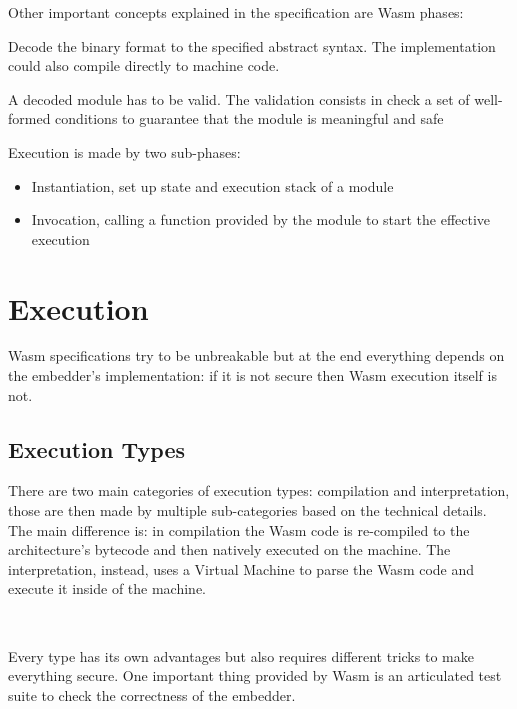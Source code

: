 Other important concepts explained in the specification are Wasm phases:

\begin{description}[font=$\bullet$ \scshape\bfseries]
  \item[Decoding]
        Decode the binary format to the specified abstract syntax. The implementation could also compile directly to machine code.
  \item[Validation]
        A decoded module has to be valid. The validation consists in check a set of well-formed conditions to guarantee that the module is meaningful and safe ~\cite{wasm-polkadot-wiki}
  \item[Execution]
        Execution is made by two sub-phases:
        \begin{itemize}
          \item Instantiation, set up state and execution stack of a module
          \item Invocation, calling a function provided by the module to start the effective execution
        \end{itemize}
\end{description}

\section{Execution}

Wasm specifications try to be unbreakable but at the end everything depends on the embedder's implementation: if it is not secure then Wasm execution itself is not.

\subsection{Execution Types}

There are two main categories of execution types: compilation and interpretation, those are then made by multiple sub-categories based on the technical details. The main difference is: in compilation the Wasm code is re-compiled to the architecture's bytecode and then natively executed on the machine. The interpretation, instead, uses a Virtual Machine to parse the Wasm code and execute it inside of the machine.

\

Every type has its own advantages but also requires different tricks to make everything secure. One important thing provided by Wasm is an articulated test suite to check the correctness of the embedder.~\cite{wasm-testsuite}

